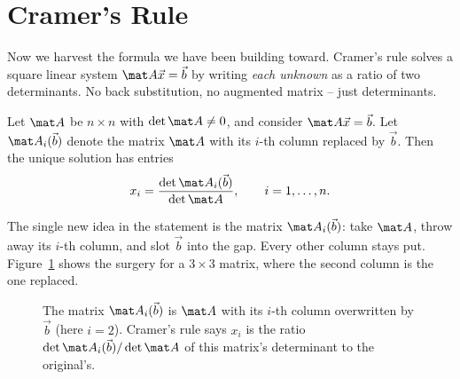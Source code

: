 \section{Cramer's Rule}

Now we harvest the formula we have been building toward. Cramer's rule solves a square linear system
$\mat A\vec x=\vec b$ by writing \emph{each unknown} as a ratio of two determinants. No back
substitution, no augmented matrix -- just determinants.

\begin{theorem}\label{ch22:thm-cramer}
Let $\mat A$ be $n\times n$ with $\det\mat A\neq 0$, and consider $\mat A\vec x=\vec b$. Let $\mat
A_i(\vec b)$ denote the matrix $\mat A$ with its $i$-th column replaced by $\vec b$. Then the unique
solution has entries
\[
x_i=\frac{\det \mat A_i(\vec b)}{\det\mat A},\qquad i=1,\dots,n.
\]
\end{theorem}

The single new idea in the statement is the matrix $\mat A_i(\vec b)$: take $\mat A$, throw away its
$i$-th column, and slot $\vec b$ into the gap. Every other column stays put. Figure~\ref{ch22:fig-replace}
shows the surgery for a $3\times3$ matrix, where the second column is the one replaced.

\begin{figure}[H]
\centering
{}
\caption{The matrix $\mat A_i(\vec b)$ is $\mat A$ with its $i$-th column overwritten by $\vec b$ (here
$i=2$). Cramer's rule says $x_i$ is the ratio $\det\mat A_i(\vec b)/\det\mat A$ of this matrix's
determinant to the original's.}
\label{ch22:fig-replace}
\end{figure}

